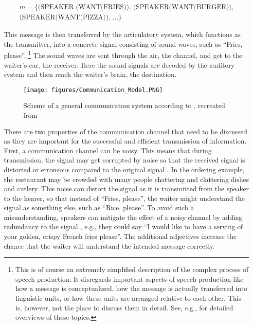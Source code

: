 \begin{equation}
\begin{gathered}
m = \{\text{(SPEAKER (WANT(FRIES)), (SPEAKER(WANT(BURGER)),}\\ \text{(SPEAKER(WANT(PIZZA)), ...}\}
\end{gathered}
\end{equation}

This message is then transferred by the articulatory system, which functions as the transmitter, into a concrete signal consisting of sound waves, such as ``Fries, please''.%
\footnote{This is of course an extremely simplified description of the complex process of speech production.
It disregards important aspects of speech production like how a message is conceptualized, how the message is actually transferred into linguistic units, or how these units are arranged relative to each other.
This is, however, not the place to discuss them in detail.
See, e.g., \citet{goldrick.etal2014} for detailed overviews of these topics.}
%
The sound waves are sent through the air, the channel, and get to the waiter's ear, the receiver.
Here the sound signals are decoded by the auditory system and then reach the waiter's brain, the destination.

\begin{figure}
\begin{center}
\texttt{[image: figures/Communication\_Model.PNG]}
\caption{Scheme of a general communication system according to \citet{shannon1948}, recreated from \citet[381]{shannon1948}}
\label{fig:communication.system}
\end{center}
\end{figure}

There are two properties of the communication channel that need to be discussed as they are important for the successful and efficient transmission of information.
First, a communication channel can be noisy. 
This means that during transmission, the signal may get corrupted by noise so that the received signal is distorted or erroneous compared to the original signal \citep[406]{shannon1948}.
In the ordering example, the restaurant may be crowded with many people chattering and clattering dishes and cutlery.
This noise can distort the signal as it is transmitted from the speaker to the hearer, so that instead of ``Fries, please'', the waiter might understand the signal as something else, such as ``Rice, please''. 
To avoid such a misunderstanding, speakers can mitigate the effect of a noisy channel by adding redundancy to the signal \citep[410]{shannon1948}, e.g., they could say ``I would like to have a serving of your golden, crispy French fries please''.
The additional adjectives increase the chance that the waiter will understand the intended message correctly.

